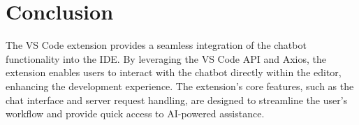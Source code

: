 \section{Conclusion}

The VS Code extension provides a seamless integration of the chatbot functionality into the IDE. By leveraging the VS Code API and Axios, the extension enables users to interact with the chatbot directly within the editor, enhancing the development experience. The extension's core features, such as the chat interface and server request handling, are designed to streamline the user's workflow and provide quick access to AI-powered assistance.